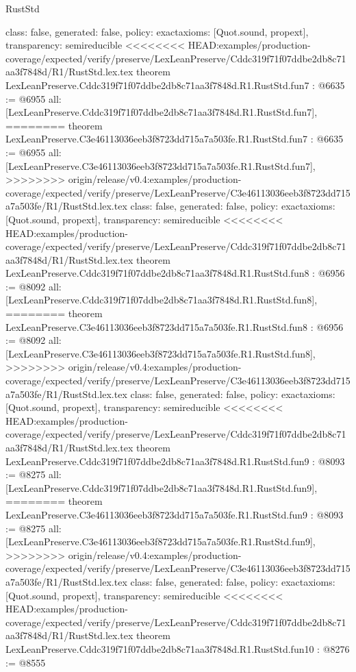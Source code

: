 \begin{lexlean}{RustStd}
\begin{coremodule}
{\begin{coremodule}
{{{{{{{{{{  class: false,
  generated: false,
  policy: exact{axioms: [Quot.sound, propext]},
  transparency: semireducible
}
<<<<<<<< HEAD:examples/production-coverage/expected/verify/preserve/LexLeanPreserve/Cddc319f71f07ddbe2db8c71aa3f7848d/R1/RustStd.lex.tex
theorem LexLeanPreserve.Cddc319f71f07ddbe2db8c71aa3f7848d.R1.RustStd.fun7 : @6635 := @6955 {
  all: [LexLeanPreserve.Cddc319f71f07ddbe2db8c71aa3f7848d.R1.RustStd.fun7],
========
theorem LexLeanPreserve.C3e46113036eeb3f8723dd715a7a503fe.R1.RustStd.fun7 : @6635 := @6955 {
  all: [LexLeanPreserve.C3e46113036eeb3f8723dd715a7a503fe.R1.RustStd.fun7],
>>>>>>>> origin/release/v0.4:examples/production-coverage/expected/verify/preserve/LexLeanPreserve/C3e46113036eeb3f8723dd715a7a503fe/R1/RustStd.lex.tex
  class: false,
  generated: false,
  policy: exact{axioms: [Quot.sound, propext]},
  transparency: semireducible
}
<<<<<<<< HEAD:examples/production-coverage/expected/verify/preserve/LexLeanPreserve/Cddc319f71f07ddbe2db8c71aa3f7848d/R1/RustStd.lex.tex
theorem LexLeanPreserve.Cddc319f71f07ddbe2db8c71aa3f7848d.R1.RustStd.fun8 : @6956 := @8092 {
  all: [LexLeanPreserve.Cddc319f71f07ddbe2db8c71aa3f7848d.R1.RustStd.fun8],
========
theorem LexLeanPreserve.C3e46113036eeb3f8723dd715a7a503fe.R1.RustStd.fun8 : @6956 := @8092 {
  all: [LexLeanPreserve.C3e46113036eeb3f8723dd715a7a503fe.R1.RustStd.fun8],
>>>>>>>> origin/release/v0.4:examples/production-coverage/expected/verify/preserve/LexLeanPreserve/C3e46113036eeb3f8723dd715a7a503fe/R1/RustStd.lex.tex
  class: false,
  generated: false,
  policy: exact{axioms: [Quot.sound, propext]},
  transparency: semireducible
}
<<<<<<<< HEAD:examples/production-coverage/expected/verify/preserve/LexLeanPreserve/Cddc319f71f07ddbe2db8c71aa3f7848d/R1/RustStd.lex.tex
theorem LexLeanPreserve.Cddc319f71f07ddbe2db8c71aa3f7848d.R1.RustStd.fun9 : @8093 := @8275 {
  all: [LexLeanPreserve.Cddc319f71f07ddbe2db8c71aa3f7848d.R1.RustStd.fun9],
========
theorem LexLeanPreserve.C3e46113036eeb3f8723dd715a7a503fe.R1.RustStd.fun9 : @8093 := @8275 {
  all: [LexLeanPreserve.C3e46113036eeb3f8723dd715a7a503fe.R1.RustStd.fun9],
>>>>>>>> origin/release/v0.4:examples/production-coverage/expected/verify/preserve/LexLeanPreserve/C3e46113036eeb3f8723dd715a7a503fe/R1/RustStd.lex.tex
  class: false,
  generated: false,
  policy: exact{axioms: [Quot.sound, propext]},
  transparency: semireducible
}
<<<<<<<< HEAD:examples/production-coverage/expected/verify/preserve/LexLeanPreserve/Cddc319f71f07ddbe2db8c71aa3f7848d/R1/RustStd.lex.tex
theorem LexLeanPreserve.Cddc319f71f07ddbe2db8c71aa3f7848d.R1.RustStd.fun10 : @8276 := @8555 {
}}}}}}}}}}}}}
\end{coremodule}}
\end{coremodule}
\end{lexlean}
